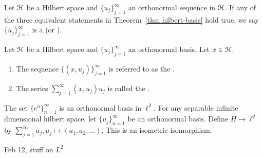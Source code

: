 \begin{definition}
    Let $\mathcal{H}$ be a Hilbert space and $\{u_j\}_{j = 1}^\infty$ an orthonormal sequence in $\mathcal{H}$. If any of the three equivalent statements in Theorem~\ref{thm:hilbert-basis} hold true, we say $\{u_j\}_{j = 1}^\infty$ is a  (or ).
\end{definition}

\begin{definition}
    Let $\mathcal{H}$ be a Hilbert space and $\{u_j\}_{j = 1}^\infty$ an orthonormal basis. Let $x \in \mathcal{H}$.
    \begin{enumerate}[label = (\arabic*),itemsep=1pt,topsep=3pt]
        \item The sequence $\{(x,u_j)\}_{j = 1}^\infty$ is referred to as the .
        \item The series $\sum_{j = 1}^\infty (x,u_j)u_j$ is called the .
    \end{enumerate}
\end{definition}

\begin{example}
    The set $\{e^n\}_{n =1}^\infty$ is an orthonormal basis in $\ell^2$. For any separable infinite dimensional hilbert space, let $\{u_j\}_{n = 1}^\infty$ be an orthonormal basis. Define $H \rightarrow \ell^2$ by $\sum_{j = 1}^\infty a_j,u_j \mapsto (a_1,a_2,...)$. This is an isometric isomorphism.
\end{example}

{\color{red} Feb 12, stuff on $L^2$}

